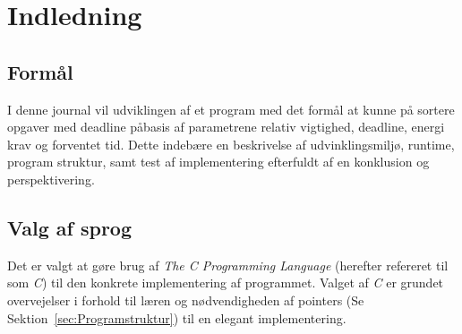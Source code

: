 \section{Indledning}
\label{sec:Indledning}

\subsection{Formål}
\label{sec:Formaal}
I denne journal vil udviklingen af et program med det form{\aa}l at kunne p{\aa} sortere opgaver med deadline p{\aa }basis af parametrene relativ vigtighed, deadline, energi krav og forventet tid. Dette indeb{\ae}re en beskrivelse af udvinklingsmilj{\o}, runtime, program struktur, samt test af implementering efterfuldt af en konklusion og perspektivering.

\subsection{Valg af sprog}
\label{sec:Valg af sprog}
Det er valgt at g{\o}re brug af \textit{The C Programming Language} (herefter refereret til som \textit{C}) til den konkrete implementering af programmet. Valget af \textit{C} er grundet overvejelser i forhold til l{\ae}ren og n{\o}dvendigheden af pointers (Se Sektion~\ref{sec:Programstruktur}) til en elegant implementering.
